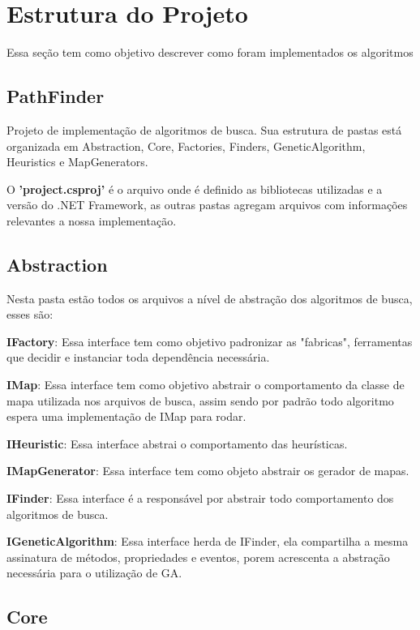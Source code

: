  \section{Estrutura do Projeto}
 
 Essa seção tem como objetivo descrever como foram implementados os algoritmos 
 
 \subsection {PathFinder}
 
 Projeto de implementação de algoritmos de busca.
 Sua estrutura de pastas está organizada em Abstraction, Core, Factories, Finders, GeneticAlgorithm, Heuristics e MapGenerators.
 
 O \textbf{'project.csproj'} é o arquivo onde é definido as bibliotecas utilizadas e a versão do .NET Framework, as outras pastas agregam arquivos com informações relevantes a nossa implementação.
 
 \subsection{Abstraction}	
 
 Nesta pasta estão todos os arquivos a nível de abstração dos algoritmos de busca, esses são:
 
 \textbf{IFactory}: Essa interface tem como objetivo padronizar as "fabricas", ferramentas que decidir e instanciar toda dependência necessária.
 
 \textbf{IMap}: Essa interface tem como objetivo abstrair o comportamento da classe de mapa utilizada nos arquivos de busca, assim sendo por padrão todo algoritmo espera uma implementação de IMap para rodar.
 
 \textbf{IHeuristic}: Essa interface abstrai o comportamento das heurísticas.
 
 \textbf{IMapGenerator}: Essa interface tem como objeto abstrair os gerador de mapas.
 
 \textbf{IFinder}: Essa interface é a responsável por abstrair todo comportamento dos algoritmos de busca.
 
 \textbf{IGeneticAlgorithm}: Essa interface herda de IFinder, ela compartilha a mesma assinatura de métodos, propriedades e eventos, porem acrescenta a abstração necessária para
 o utilização de GA.
 
 
 \subsection{Core}
 
